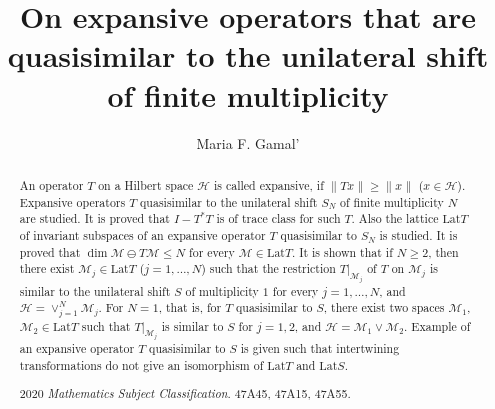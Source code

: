 \documentclass[a4paper,oneside,11pt]{amsart}
\numberwithin{equation}{section}
\theoremstyle{plain}
\theoremstyle{definition}
\begin{document}
\title[On expansive operators]{On expansive operators that are quasisimilar
 to the unilateral shift of finite multiplicity}

\author{Maria F. Gamal'}
\address{
 St. Petersburg Branch\\ V. A. Steklov Institute 
of Mathematics\\
Russian Academy of Sciences\\ Fontanka 27, St. Petersburg\\ 
191023, Russia  
}





\begin{abstract}
An operator $T$ on a Hilbert space $\mathcal H$ is called expansive, if $\|Tx\|\geq \|x\|$ ($x\in\mathcal H$). 
Expansive operators  $T$  quasisimilar to the unilateral shift $S_N$ of finite multiplicity $N$ are studied. 
It is proved that $I-T^*T$ is of trace class for such $T$. Also the lattice $\mathrm{Lat}T$ of invariant subspaces of an expansive operator  $T$ quasisimilar to $S_N$ is studied. It is proved that $\dim\mathcal M\ominus T\mathcal M\leq  N$ 
for  every $\mathcal M\in\mathrm{Lat}T$.  It is shown that if $N\geq 2$, then there exist $\mathcal M_j\in\mathrm{Lat}T$ ($j=1,\ldots, N$)  such that 
the restriction $T|_{\mathcal M_j}$ of $T$ on $\mathcal M_j$ is similar to the  unilateral shift $S$ of multiplicity $1$ 
for every $j=1,\ldots, N$, 
and $\mathcal H=\vee_{j=1}^N\mathcal M_j$. For $N=1$, that is, for $T$ quasisimilar to $S$, there exist two spaces 
 $\mathcal M_1$,  $\mathcal M_2\in\mathrm{Lat}T$  such that $T|_{\mathcal M_j}$ is similar to $S$  
for $j=1,2$, 
and $\mathcal H=\mathcal M_1\vee\mathcal M_2$. Example of an expansive operator $T$ quasisimilar to $S$ is given such that intertwining transformations do  not give an isomorphism of $\mathrm{Lat}T$ and $\mathrm{Lat}S$.

 

2020 \emph{Mathematics Subject Classification}. 47A45, 47A15, 47A55.

 \end{abstract} 


\maketitle
\end{document}
